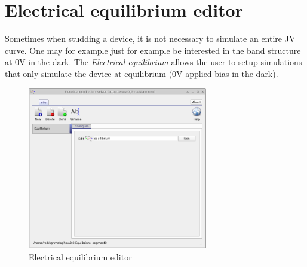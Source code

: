 \newpage
\section{Electrical equilibrium editor}
Sometimes when studding a device, it is not necessary to simulate an entire JV curve. One may for example just for example be interested in the band structure at 0V in the dark. The \emph{Electrical equilibrium} allows the user to setup simulations that only simulate the device at equilibrium (0V applied bias in the dark).

\begin{figure}[H]
\centering
\includegraphics[width=0.7\textwidth,height=0.5\textwidth]{./images/sim_editors/equilibrium.png}
\caption{Electrical equilibrium editor}
\label{fig:equilibrium_editor}
\end{figure}
